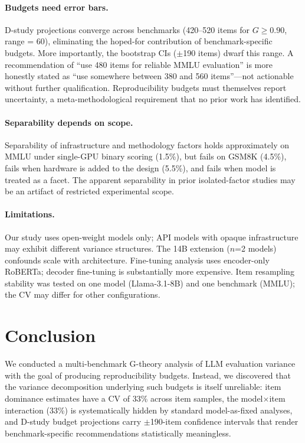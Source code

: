 \documentclass[11pt]{article}
\begin{document}
\paragraph{Budgets need error bars.}
D-study projections converge across benchmarks (420--520 items for $G \geq 0.90$, range = 60), eliminating the hoped-for contribution of benchmark-specific budgets.
More importantly, the bootstrap CIs ($\pm$190 items) dwarf this range.
A recommendation of ``use 480 items for reliable MMLU evaluation'' is more honestly stated as ``use somewhere between 380 and 560 items''---not actionable without further qualification.
Reproducibility budgets must themselves report uncertainty, a meta-methodological requirement that no prior work has identified.

\paragraph{Separability depends on scope.}
Separability of infrastructure and methodology factors holds approximately on MMLU under single-GPU binary scoring (1.5\%), but fails on GSM8K (4.5\%), fails when hardware is added to the design (5.5\%), and fails when model is treated as a facet.
The apparent separability in prior isolated-factor studies may be an artifact of restricted experimental scope.

\paragraph{Limitations.}
Our study uses open-weight models only; API models with opaque infrastructure may exhibit different variance structures.
The 14B extension ($n$=2 models) confounds scale with architecture.
Fine-tuning analysis uses encoder-only RoBERTa; decoder fine-tuning is substantially more expensive.
Item resampling stability was tested on one model (Llama-3.1-8B) and one benchmark (MMLU); the CV may differ for other configurations.

\section{Conclusion}

We conducted a multi-benchmark G-theory analysis of LLM evaluation variance with the goal of producing reproducibility budgets.
Instead, we discovered that the variance decomposition underlying such budgets is itself unreliable: item dominance estimates have a CV of 33\% across item samples, the model$\times$item interaction (33\%) is systematically hidden by standard model-as-fixed analyses, and D-study budget projections carry $\pm$190-item confidence intervals that render benchmark-specific recommendations statistically meaningless.
\end{document}
